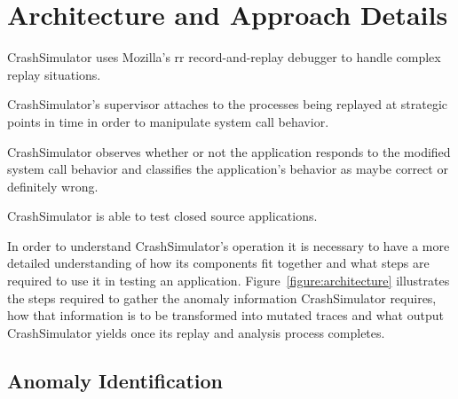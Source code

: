 \section{Architecture and Approach Details}
\label{SEC:architecture}

CrashSimulator uses Mozilla's rr record-and-replay debugger to handle
complex replay situations.

CrashSimulator's supervisor attaches to the processes being replayed at
strategic points in time in order to manipulate system call behavior.

CrashSimulator observes whether or not the application responds to the
modified system call behavior and classifies the application's behavior as
maybe correct or definitely wrong.

CrashSimulator is able to test closed source applications.




In order to understand CrashSimulator's operation it is necessary to have a
more detailed understanding of how its components fit together and what
steps are required to use it in testing an application.
Figure~\ref{figure:architecture} illustrates the steps required to gather
the anomaly information CrashSimulator requires, how that information is to
be transformed into mutated traces and what output CrashSimulator yields
once its replay and analysis process completes.

\subsection{Anomaly Identification} \label{subsec:anomalyidentification}


